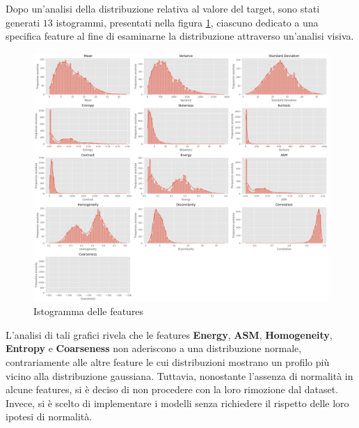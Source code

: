 Dopo un'analisi della distribuzione relativa al valore del target, sono stati
generati $13$ istogrammi, presentati nella figura \ref{fig:barplot_features},
ciascuno dedicato a una specifica feature al fine di esaminarne la distribuzione
attraverso un'analisi visiva.
\begin{figure}[!ht]
      \centering
      \includegraphics[width=\textwidth]{img/analisi/barplot.png}
      \caption{Istogramma delle features}
      \label{fig:barplot_features}
\end{figure}
L'analisi di tali grafici rivela che le features \textbf{Energy}, \textbf{ASM},
\textbf{Homogeneity}, \textbf{Entropy} e \textbf{Coarseness} non aderiscono a
una distribuzione normale, contrariamente alle altre feature le cui distribuzioni
mostrano un profilo più vicino alla distribuzione gaussiana. Tuttavia, nonostante
l'assenza di normalità in alcune features, si è deciso di non procedere con la
loro rimozione dal dataset. Invece, si è scelto di implementare i modelli senza
richiedere il rispetto delle loro ipotesi di normalità.


